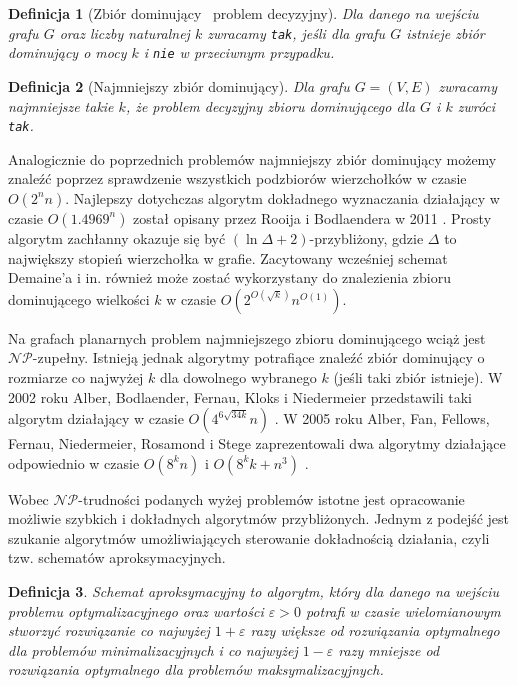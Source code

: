 \documentclass[twoside,a4paper,12pt]{report} %
\theoremstyle{break}
\newtheorem{definition}{Definicja}[section]
\begin{document}
\begin{definition}[Zbiór dominujący \textendash\ problem decyzyjny]
Dla danego na wejściu grafu $G$ oraz liczby naturalnej $k$ zwracamy \texttt{tak}, jeśli dla grafu $G$ istnieje zbiór dominujący o mocy $k$ i \texttt{nie} w przeciwnym przypadku.
\end{definition}

\begin{definition}[Najmniejszy zbiór dominujący]
Dla grafu $G=(V,E)$ zwracamy najmniejsze takie $k$, że problem decyzyjny zbioru dominującego dla $G$ i $k$ zwróci \texttt{tak}.
\end{definition}

Analogicznie do poprzednich problemów najmniejszy zbiór dominujący możemy znaleźć poprzez sprawdzenie wszystkich podzbiorów wierzchołków w czasie $O(2^nn)$. Najlepszy dotychczas algorytm dokładnego wyznaczania działający w czasie $O(1.4969^n)$ został opisany przez Rooija i Bodlaendera w 2011 \cite{rooij}. Prosty algorytm zachłanny okazuje się być $(\ln{\Delta} + 2)$-przybliżony, gdzie $\Delta$ to największy stopień wierzchołka w grafie.
Zacytowany wcześniej schemat Demaine'a i in. \cite{erik} również może zostać wykorzystany do znalezienia zbioru dominującego wielkości $k$ w czasie $O(2^{O(\sqrt{k})}n^{O(1)})$.

Na grafach planarnych problem najmniejszego zbioru dominującego wciąż jest $\mathcal{NP}$-zupełny. Istnieją jednak algorytmy potrafiące znaleźć zbiór dominujący o rozmiarze co najwyżej $k$ dla dowolnego wybranego $k$ (jeśli taki zbiór istnieje). W 2002 roku Alber, Bodlaender, Fernau, Kloks i Niedermeier przedstawili taki algorytm działający w czasie $O(4^{6\sqrt{34k}}n)$ \cite{Alber2002}. W 2005 roku Alber, Fan, Fellows, Fernau, Niedermeier, Rosamond i Stege zaprezentowali dwa algorytmy działające odpowiednio w czasie $O(8^kn)$ i $O(8^kk+n^3)$ \cite{ALBER2005385}. 

Wobec $\mathcal{NP}$-trudności podanych wyżej problemów istotne jest opracowanie możliwie szybkich i dokładnych algorytmów przybliżonych. Jednym z podejść jest szukanie algorytmów umożliwiających sterowanie dokładnością działania, czyli tzw. schematów aproksymacyjnych.

\begin{definition} \label{def_schemat}
Schemat aproksymacyjny to algorytm, który dla danego na wejściu problemu optymalizacyjnego oraz wartości $\varepsilon > 0$ potrafi w czasie wielomianowym stworzyć rozwiązanie co najwyżej $1+ \varepsilon$ razy większe od rozwiązania optymalnego dla problemów minimalizacyjnych i co najwyżej $1-\varepsilon$ razy mniejsze od rozwiązania optymalnego dla problemów maksymalizacyjnych.
\end{definition}
\end{document}
